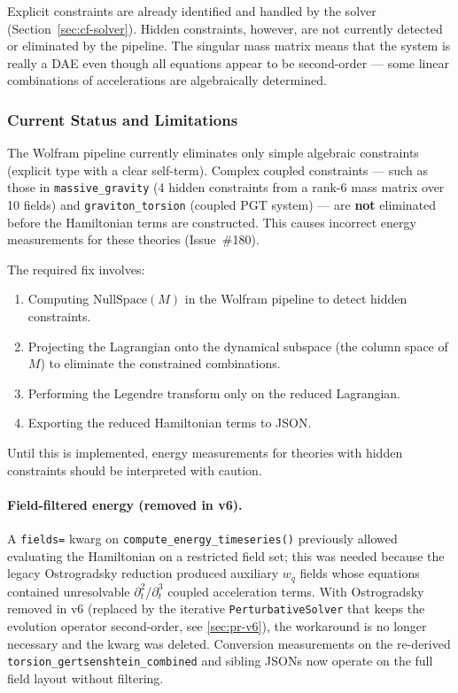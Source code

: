Explicit constraints are already identified and handled by the solver
(Section~\ref{sec:cf-solver}). Hidden constraints, however, are not currently
detected or eliminated by the pipeline. The singular mass matrix means that the
system is really a DAE even though all equations appear to be second-order ---
some linear combinations of accelerations are algebraically determined.

\subsubsection{Current Status and Limitations}
\label{sec:cf-hamiltonian-status}

The Wolfram pipeline currently eliminates only simple algebraic constraints
(explicit type with a clear self-term). Complex coupled constraints --- such as
those in \texttt{massive\_gravity} (4 hidden constraints from a rank-6 mass matrix
over 10 fields) and \texttt{graviton\_torsion} (coupled PGT system) --- are
\textbf{not} eliminated before the Hamiltonian terms are constructed. This causes
incorrect energy measurements for these theories (Issue~\#180).

The required fix involves:
\begin{enumerate}
  \item Computing $\mathrm{NullSpace}(M)$ in the Wolfram pipeline to detect
    hidden constraints.
  \item Projecting the Lagrangian onto the dynamical subspace (the column space
    of $M$) to eliminate the constrained combinations.
  \item Performing the Legendre transform only on the reduced Lagrangian.
  \item Exporting the reduced Hamiltonian terms to JSON.
\end{enumerate}

Until this is implemented, energy measurements for theories with hidden
constraints should be interpreted with caution.

\paragraph{Field-filtered energy (removed in v6).}
A \texttt{fields=} kwarg on \texttt{compute\_energy\_timeseries()} previously allowed evaluating the Hamiltonian on a restricted field set; this was needed because the legacy Ostrogradsky reduction produced auxiliary $w_q$ fields whose equations contained unresolvable $\partial_t^2$/$\partial_t^3$ coupled acceleration terms. With Ostrogradsky removed in v6 (replaced by the iterative \verb|PerturbativeSolver| that keeps the evolution operator second-order, see \cref{sec:pr-v6}), the workaround is no longer necessary and the kwarg was deleted. Conversion measurements on the re-derived \verb|torsion_gertsenshtein_combined| and sibling JSONs now operate on the full field layout without filtering.

